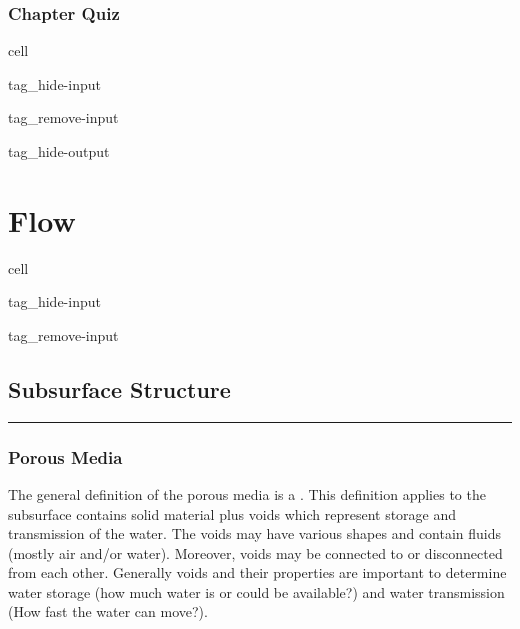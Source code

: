 \documentclass[letterpaper,10pt,english]{jupyterBook}
\begin{document}
\section{Chapter Quiz}
\label{\detokenize{content/background/03_basic_hydrogeology:chapter-quiz}}
\begin{sphinxuseclass}{cell}
\begin{sphinxuseclass}{tag_hide-input}
\begin{sphinxuseclass}{tag_remove-input}
\begin{sphinxuseclass}{tag_hide-output}
\end{sphinxuseclass}
\end{sphinxuseclass}
\end{sphinxuseclass}
\end{sphinxuseclass}
\sphinxstepscope


\part{Flow}

\sphinxstepscope

\begin{sphinxuseclass}{cell}
\begin{sphinxuseclass}{tag_hide-input}
\begin{sphinxuseclass}{tag_remove-input}
\end{sphinxuseclass}
\end{sphinxuseclass}
\end{sphinxuseclass}

\chapter{Subsurface Structure}
\label{\detokenize{content/flow/12_subsurface_structure:subsurface-structure}}\label{\detokenize{content/flow/12_subsurface_structure::doc}}
\sphinxAtStartPar
{}


\bigskip\hrule\bigskip



\section{Porous Media}
\label{\detokenize{content/flow/12_subsurface_structure:porous-media}}
\sphinxAtStartPar
The general definition of the porous media is a . This definition applies to the subsurface contains solid material plus voids which represent storage and transmission of the water. The voids may have various shapes and contain fluids (mostly air and/or water). Moreover, voids may be connected to or disconnected from each other.
Generally voids and their properties are important to determine water storage (how much water is or could be available?) and water transmission (How fast the water can move?).
\end{document}
